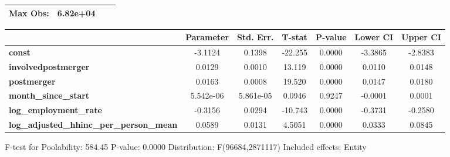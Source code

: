 \documentclass{report}
\begin{document}
\begin{center}
\begin{tabular}{lclc}
\textbf{Max Obs:}                                &       6.82e+04       & \textbf{                     }   &                  \\
\bottomrule
\end{tabular}
\begin{tabular}{lcccccc}
                                                 & \textbf{Parameter} & \textbf{Std. Err.} & \textbf{T-stat} & \textbf{P-value} & \textbf{Lower CI} & \textbf{Upper CI}  \\
\midrule
\textbf{const}                                   &      -3.1124       &       0.1398       &     -22.255     &      0.0000      &      -3.3865      &      -2.8383       \\
\textbf{involvedpostmerger}                      &       0.0129       &       0.0010       &      13.119     &      0.0000      &       0.0110      &       0.0148       \\
\textbf{postmerger}                              &       0.0163       &       0.0008       &      19.520     &      0.0000      &       0.0147      &       0.0180       \\
\textbf{month\_since\_start}                     &     5.542e-06      &     5.861e-05      &      0.0946     &      0.9247      &      -0.0001      &       0.0001       \\
\textbf{log\_employment\_rate}                   &      -0.3156       &       0.0294       &     -10.743     &      0.0000      &      -0.3731      &      -0.2580       \\
\textbf{log\_adjusted\_hhinc\_per\_person\_mean} &       0.0589       &       0.0131       &      4.5051     &      0.0000      &       0.0333      &       0.0845       \\
\bottomrule
\end{tabular}
\end{center}

F-test for Poolability: 584.45 \newline
 P-value: 0.0000 \newline
 Distribution: F(96684,2871117) \newline
  \newline
 Included effects: Entity
\end{document}
